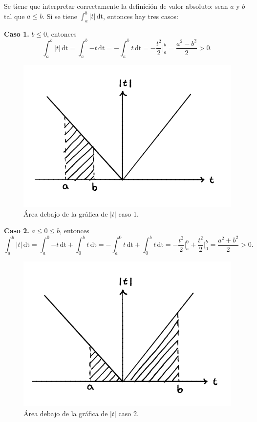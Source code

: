 \documentclass{article}
\numberwithin{equation}{section}
\begin{document}
Se tiene que interpretar correctamente la definición de valor absoluto:  sean $a$ y $b$ tal que $a\leq b$. Si se tiene $\int_{a}^{b} \! {|t|} \, \mathrm{dt}$, entonces hay tres casos:

\vspace{0.5cm}

\textbf{Caso 1.} $b\leq 0$, entonces 
$$\int_{a}^{b} \! {|t|} \, \mathrm{dt}=\int_{a}^{b} \! {-t} \, \mathrm{dt}=-\int_{a}^{b} \! {t} \, \mathrm{dt}=-\frac{t^2}{2}\Big|_a^b=\frac{a^2-b^2}{2}>0.$$

\begin{figure}[h]
    \centering
    \includegraphics[scale=0.3]{images/fig3.png}
    \caption{Área debajo de la gráfica de $|t|$ caso 1.}
    \label{fig:fig3}
\end{figure}

\textbf{Caso 2.} $a\leq 0\leq b$, entonces
$$\int_{a}^{b} \! {|t|} \, \mathrm{dt}=\int_{a}^{0} \! {-t} \, \mathrm{dt}+\int_{0}^{b} \! {t} \, \mathrm{dt}=-\int_{a}^{0} \! {t} \, \mathrm{dt}+\int_{0}^{b} \! {t} \, \mathrm{dt}=-\frac{t^2}{2}\Big|_a^0+\frac{t^2}{2}\Big|_0^b=\frac{a^2+b^2}{2}>0.$$

\begin{figure}[h]
    \centering
    \includegraphics[scale=0.3]{images/fig4.png}
    \caption{Área debajo de la gráfica de $|t|$ caso 2.}
    \label{fig:fig4}
\end{figure}
\end{document}
